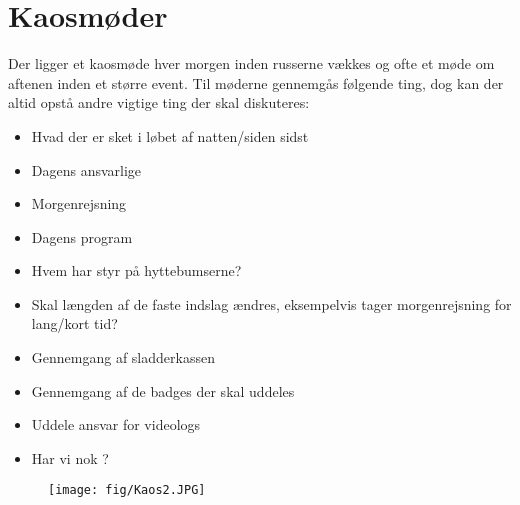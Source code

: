 \section{Kaosmøder}
Der ligger et kaosmøde hver morgen inden russerne vækkes og ofte et møde om aftenen inden et større event. Til møderne gennemgås følgende ting, dog kan der altid opstå andre vigtige ting der skal diskuteres:
\begin{itemize}
  \item Hvad der er sket i løbet af natten/siden sidst
  \item Dagens ansvarlige
  \item Morgenrejsning
  \item Dagens program
  \item Hvem har styr på hyttebumserne?
  \item Skal længden af de faste indslag ændres, eksempelvis tager morgenrejsning for lang/kort tid?
  \item Gennemgang af sladderkassen 
  \item Gennemgang af de badges der skal uddeles
  \item Uddele ansvar for videologs
  \item Har vi nok ? %
\end{itemize}

\begin{figure}[H]
\begin{center}
\texttt{[image: fig/Kaos2.JPG]}
\caption{}
\end{center}
\end{figure}